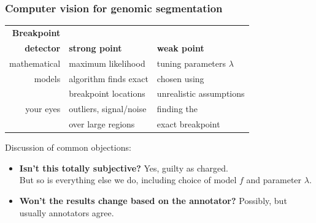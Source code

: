 \documentclass{beamer}
\begin{document}
\begin{frame}
  \frametitle{Computer vision for genomic segmentation}
  \begin{center}
  \begin{tabular}{rll}
    \textbf{Breakpoint}\\
 \textbf{detector} & \textbf{strong point} & \textbf{weak point} \\
    \hline
    mathematical  & maximum likelihood & tuning parameters $\lambda$ \\
    models & algorithm finds exact  & chosen using\\
& breakpoint locations  & unrealistic assumptions\\
    \hline
    your eyes & outliers, signal/noise & finding the \\
    & over large regions &  exact breakpoint
  \end{tabular}
  \end{center}

  Discussion of common objections:
  \begin{itemize}
  \item \textbf{Isn't this totally subjective?} Yes, guilty as
    charged. \\
    But so is everything else we do, including choice of
    model $f$ and parameter $\lambda$.
  \item \textbf{Won't the results change based on the annotator?}
    Possibly, but usually annotators agree.
  \end{itemize}
\end{frame}
\end{document}
